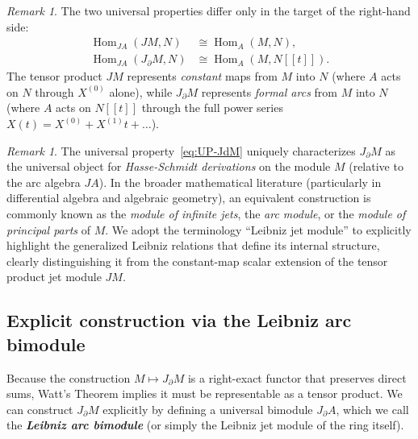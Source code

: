 \documentclass[a4paper, 12pt]{amsart}
\newcommand{\defterm}[1]{\textbf{\textit{#1}}\index{#1}}
\theoremstyle{definition}
\theoremstyle{remark}
\newtheorem{remark}[theorem]{Remark}
\begin{document}
\begin{remark}
  \label{rmk:comparison-UP}
  The two universal properties differ only in the target of the right-hand side:
  \begin{align*}
    \operatorname{Hom}_{JA}(JM, N) &\cong \operatorname{Hom}_A(M, N), \\
    \operatorname{Hom}_{JA}(J_\partial M, N) &\cong \operatorname{Hom}_A(M, N[[t]]).
  \end{align*}
  The tensor product $JM$ represents \emph{constant} maps from $M$ into $N$
  (where $A$ acts on $N$ through $X^{(0)}$ alone),
  while $J_\partial M$ represents \emph{formal arcs} from $M$ into $N$
  (where $A$ acts on $N[[t]]$ through the full power series $X(t) = X^{(0)} + X^{(1)}t + \dots$).
\end{remark}

\begin{remark}
  \label{rmk:literature-context}
  The universal property~\eqref{eq:UP-JdM} uniquely characterizes $J_\partial M$ as the universal object for \emph{Hasse-Schmidt derivations} on the module $M$ (relative to the arc algebra $JA$). In the broader mathematical literature (particularly in differential algebra and algebraic geometry), an equivalent construction is commonly known as the \emph{module of infinite jets}, the \emph{arc module}, or the \emph{module of principal parts} of $M$. We adopt the terminology ``Leibniz jet module'' to explicitly highlight the generalized Leibniz relations that define its internal structure, clearly distinguishing it from the constant-map scalar extension of the tensor product jet module $JM$.
\end{remark}

\subsection{Explicit construction via the Leibniz arc bimodule}
\label{sec:expl-constr}

Because the construction $M \mapsto J_\partial M$ is a right-exact functor that preserves direct sums, Watt's Theorem implies it must be representable as a tensor product. We can construct $J_\partial M$ explicitly by defining a universal bimodule $J_\partial A$, which we call the \defterm{Leibniz arc bimodule} (or simply the Leibniz jet module of the ring itself).
\end{document}
